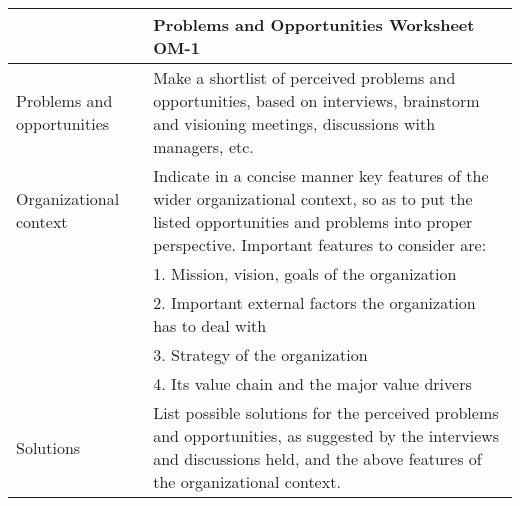 \begin{tabular}%
       {|>{\colleft}p{3cm}%
        |>{\colleft}p{8.5cm}|}
\hline
{\bf Organization Model} &
   {\bf Problems and Opportunities Worksheet OM-1} \\
\hline
\hline
\sc Problems and opportunities &
   {\rm
   Make a shortlist of perceived problems and opportunities, based on
   interviews, brainstorm and visioning meetings, discussions with
   managers, etc.
   } \\
\hline
\sc Organizational context &
   {\rm
   Indicate in a concise manner key features of the wider
   organizational context, so as to put the listed opportunities and
   problems into proper perspective. Important features to consider
   are:
   } \\
 & {\rm 1. Mission, vision, goals of the organization} \\
 & {\rm 2. Important external factors the
           organization has to deal with} \\
 & {\rm 3. Strategy of the organization} \\
 & {\rm 4. Its value chain and the major value drivers} \\
\hline
\sc Solutions &
   {\rm
   List possible solutions for the perceived problems and
   opportunities, as suggested by the interviews and discussions held,
   and the above features of the organizational context.
   } \\
\hline
\end{tabular}
